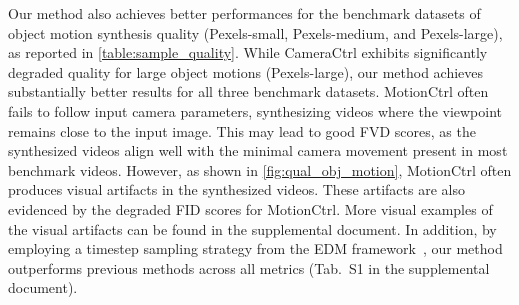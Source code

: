 Our method also achieves better performances for the benchmark datasets of object motion synthesis quality (Pexels-small, Pexels-medium, and Pexels-large), as reported in \cref{table:sample_quality}.
While CameraCtrl exhibits significantly degraded quality for large object motions (Pexels-large), our method achieves substantially better results for all three benchmark datasets.
MotionCtrl often fails to follow input camera parameters, synthesizing videos where the viewpoint remains close to the input image. This may lead to good FVD scores, as the synthesized videos align well with the minimal camera movement present in most benchmark videos.
However, as shown in \cref{fig:qual_obj_motion}, MotionCtrl often produces visual artifacts in the synthesized videos.
These artifacts are also evidenced by the degraded FID scores for MotionCtrl.
More visual examples of the visual artifacts can be found in the supplemental document.
In addition, by employing a timestep sampling strategy from the EDM framework~\cite{karras2022elucidating}, our method outperforms previous methods across all metrics (Tab.~S1 in the supplemental document).



